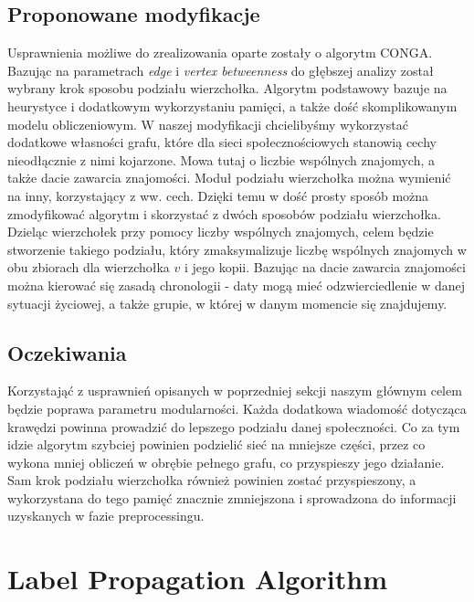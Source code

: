 \documentclass{article}
\begin{document}
\subsection{Proponowane modyfikacje}
Usprawnienia możliwe do zrealizowania oparte zostały o algorytm CONGA. Bazując na parametrach \textit{edge} i \textit{vertex betweenness} do głębszej analizy został wybrany krok sposobu podziału wierzchołka. Algorytm podstawowy bazuje na heurystyce i dodatkowym wykorzystaniu pamięci, a także dość skomplikowanym modelu obliczeniowym. W naszej modyfikacji chcielibyśmy wykorzystać dodatkowe własności grafu, które dla sieci społecznościowych stanowią cechy nieodłącznie z nimi kojarzone. Mowa tutaj o liczbie wspólnych znajomych, a także dacie zawarcia znajomości. Moduł podziału wierzchołka można wymienić na inny, korzystający z ww. cech. Dzięki temu w dość prosty sposób można zmodyfikować algorytm i skorzystać z dwóch sposobów podziału wierzchołka. Dzieląc wierzchołek przy pomocy liczby wspólnych znajomych, celem będzie stworzenie takiego podziału, który zmaksymalizuje liczbę wspólnych znajomych w obu zbiorach dla wierzchołka $v$ i jego kopii. Bazując na dacie zawarcia znajomości można kierować się zasadą chronologii - daty mogą mieć odzwierciedlenie w danej sytuacji życiowej, a także grupie, w której w danym momencie się znajdujemy.
\subsection{Oczekiwania}
Korzystająć z usprawnień opisanych w poprzedniej sekcji naszym głównym celem będzie poprawa parametru modularności. Każda dodatkowa wiadomość dotycząca krawędzi powinna prowadzić do lepszego podziału danej społeczności. Co za tym idzie algorytm szybciej powinien podzielić sieć na mniejsze części, przez co wykona mniej obliczeń w obrębie pełnego grafu, co przyspieszy jego działanie. Sam krok podziału wierzchołka również powinien zostać przyspieszony, a wykorzystana do tego pamięć znacznie zmniejszona i sprowadzona do informacji uzyskanych w fazie preprocessingu.

\newpage
\section{Label Propagation Algorithm}
\end{document}
